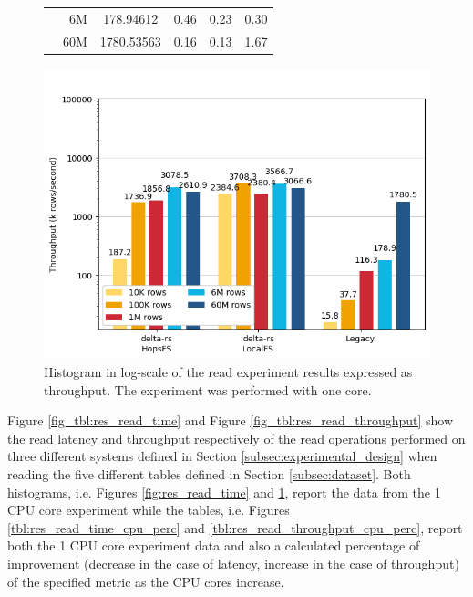 \begin{figure}
\begin{minipage}[b]{\textwidth}
\begin{tabular}{c r S[table-format=4.5] S[table-format=2.2] S[table-format=2.2] S[table-format=2.2]}
            & 6M &   178.94612 & 0.46 & 0.23 & 0.30\\
            & 60M &  1780.53563 & 0.16 & 0.13 & 1.67\\
            \bottomrule
        \end{tabular}
    \end{minipage}
    \begin{minipage}[b]{\textwidth}
        \includegraphics[width=\textwidth]{figures/5-results/read/read_throughput_1_core.png}
        \caption[Histogram of the read experiment - Throughput - 1 CPU core]{Histogram in log-scale of the read experiment results expressed as throughput. The experiment was performed with one  core.}
        \label{fig:res_read_throughput}
    \end{minipage}
\end{figure}

Figure \ref{fig_tbl:res_read_time} and Figure \ref{fig_tbl:res_read_throughput} show the read latency and throughput respectively of the read operations performed on three different systems defined in Section \ref{subsec:experimental_design} when reading the five different tables defined in Section \ref{subsec:dataset}. Both histograms, i.e. Figures \ref{fig:res_read_time} and \ref{fig:res_read_throughput}, report the data from the 1 \gls{CPU} core experiment while the tables, i.e. Figures \ref{tbl:res_read_time_cpu_perc} and \ref{tbl:res_read_throughput_cpu_perc}, report both the 1 \gls{CPU} core experiment data and also a calculated percentage of improvement (decrease in the case of latency, increase in the case of throughput) of the specified metric as the \gls{CPU} cores increase.

